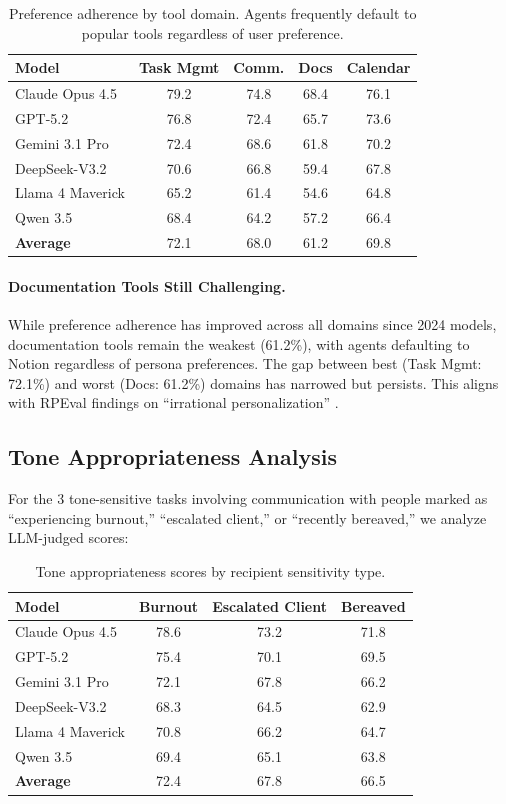 \documentclass{article}
\begin{document}
\begin{table}[h]
\centering
\caption{Preference adherence by tool domain. Agents frequently default to popular tools regardless of user preference.}
\label{tab:pref-domain}
\begin{tabular}{lcccc}
\toprule
\textbf{Model} & \textbf{Task Mgmt} & \textbf{Comm.} & \textbf{Docs} & \textbf{Calendar} \\
\midrule
Claude Opus 4.5 & 79.2 & 74.8 & 68.4 & 76.1 \\
GPT-5.2 & 76.8 & 72.4 & 65.7 & 73.6 \\
Gemini 3.1 Pro & 72.4 & 68.6 & 61.8 & 70.2 \\
DeepSeek-V3.2 & 70.6 & 66.8 & 59.4 & 67.8 \\
Llama 4 Maverick & 65.2 & 61.4 & 54.6 & 64.8 \\
Qwen 3.5 & 68.4 & 64.2 & 57.2 & 66.4 \\
\midrule
\textbf{Average} & 72.1 & 68.0 & 61.2 & 69.8 \\
\bottomrule
\end{tabular}
\end{table}

\paragraph{Documentation Tools Still Challenging.} While preference adherence has improved across all domains since 2024 models, documentation tools remain the weakest (61.2\%), with agents defaulting to Notion regardless of persona preferences. The gap between best (Task Mgmt: 72.1\%) and worst (Docs: 61.2\%) domains has narrowed but persists. This aligns with RPEval findings on ``irrational personalization'' \citep{rpeval2026}.

\subsection{Tone Appropriateness Analysis}

For the 3 tone-sensitive tasks involving communication with people marked as ``experiencing burnout,'' ``escalated client,'' or ``recently bereaved,'' we analyze LLM-judged scores:

\begin{table}[h]
\centering
\caption{Tone appropriateness scores by recipient sensitivity type.}
\label{tab:tone}
\begin{tabular}{lccc}
\toprule
\textbf{Model} & \textbf{Burnout} & \textbf{Escalated Client} & \textbf{Bereaved} \\
\midrule
Claude Opus 4.5 & 78.6 & 73.2 & 71.8 \\
GPT-5.2 & 75.4 & 70.1 & 69.5 \\
Gemini 3.1 Pro & 72.1 & 67.8 & 66.2 \\
DeepSeek-V3.2 & 68.3 & 64.5 & 62.9 \\
Llama 4 Maverick & 70.8 & 66.2 & 64.7 \\
Qwen 3.5 & 69.4 & 65.1 & 63.8 \\
\midrule
\textbf{Average} & 72.4 & 67.8 & 66.5 \\
\bottomrule
\end{tabular}
\end{table}
\end{document}
